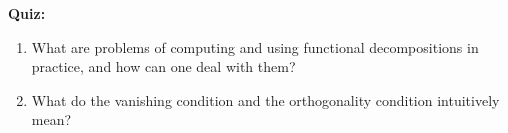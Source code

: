 \textbf{Quiz:}
\begin{enumerate}

    \item
    What are problems of computing and using functional decompositions in practice, and how can one deal with them?
    \item 
    What do the vanishing condition and the orthogonality condition intuitively mean?

\end{enumerate}